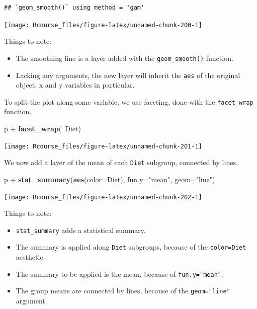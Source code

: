 \documentclass[]{book}
\newenvironment{Shaded}{\begin{snugshade}}{\end{snugshade}}
\newcommand{\KeywordTok}[1]{\textcolor[rgb]{0.13,0.29,0.53}{\textbf{{#1}}}}
\newcommand{\DataTypeTok}[1]{\textcolor[rgb]{0.13,0.29,0.53}{{#1}}}
\newcommand{\StringTok}[1]{\textcolor[rgb]{0.31,0.60,0.02}{{#1}}}
\newcommand{\NormalTok}[1]{{#1}}
\providecommand{\tightlist}{%
  \setlength{\itemsep}{0pt}\setlength{\parskip}{0pt}}
\theoremstyle{definition}
\theoremstyle{definition}
\theoremstyle{remark}
\begin{document}
\begin{verbatim}
## `geom_smooth()` using method = 'gam'
\end{verbatim}

\texttt{[image: Rcourse\_files/figure-latex/unnamed-chunk-200-1]}

Things to note:

\begin{itemize}
\tightlist
\item
  The smoothing line is a layer added with the \texttt{geom\_smooth()}
  function.
\item
  Lacking any arguments, the new layer will inherit the \texttt{aes} of
  the original object, x and y variables in particular.
\end{itemize}

To split the plot along some variable, we use faceting, done with the
\texttt{facet\_wrap} function.

\begin{Shaded}
\begin{Highlighting}[]
\NormalTok{p +}\StringTok{ }\KeywordTok{facet_wrap}\NormalTok{(~Diet)}
\end{Highlighting}
\end{Shaded}

\texttt{[image: Rcourse\_files/figure-latex/unnamed-chunk-201-1]}

We now add a layer of the mean of each \texttt{Diet} subgroup, connected
by lines.

\begin{Shaded}
\begin{Highlighting}[]
\NormalTok{p +}\StringTok{ }\KeywordTok{stat_summary}\NormalTok{(}\KeywordTok{aes}\NormalTok{(}\DataTypeTok{color=}\NormalTok{Diet), }\DataTypeTok{fun.y=}\StringTok{"mean"}\NormalTok{, }\DataTypeTok{geom=}\StringTok{"line"}\NormalTok{)}
\end{Highlighting}
\end{Shaded}

\texttt{[image: Rcourse\_files/figure-latex/unnamed-chunk-202-1]}

Things to note:

\begin{itemize}
\tightlist
\item
  \texttt{stat\_summary} adds a statistical summary.
\item
  The summary is applied along \texttt{Diet} subgroups, because of the
  \texttt{color=Diet} aesthetic.
\item
  The summary to be applied is the mean, because of
  \texttt{fun.y="mean"}.
\item
  The group means are connected by lines, because of the
  \texttt{geom="line"} argument.
\end{itemize}
\end{document}
